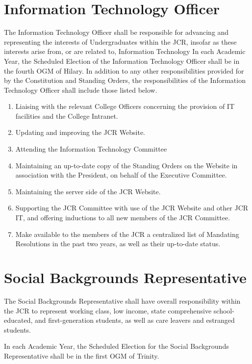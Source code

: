 \section{Information Technology Officer}
\npara The Information Technology Officer shall be responsible for advancing and representing the interests of Undergraduates within the JCR, insofar as these interests arise from, or are related to, Information Technology
\npara In each Academic Year, the Scheduled Election of the Information Technology Officer shall be in the fourth OGM of Hilary.
\npara In addition to any other responsibilities provided for by the Constitution and Standing Orders, the responsibilities of the Information Technology Officer shall include those listed below.
\begin{enumerate}
    \item Liaising with the relevant College Officers concerning the provision of IT facilities and the College Intranet. 
    \item Updating and improving the JCR Website.
    \item Attending the Information Technology Committee 
    \item Maintaining an up-to-date copy of the Standing Orders on the Website in association with the President, on behalf of the Executive Committee. 
    \item Maintaining the server side of the JCR Website. 
    \item Supporting the JCR Committee with use of the JCR Website and other JCR IT, and offering inductions to all new members of the JCR Committee.
    \item Make available to the members of the JCR a centralized list of Mandating Resolutions in the past two years, as well as their up-to-date status.
\end{enumerate}
\section{Social Backgrounds Representative}
\npara	The Social Backgrounds Representative shall have overall responsibility within the JCR to represent working class, low income, state comprehensive school-educated, and first-generation students, as well as care leavers and estranged students.

\npara In each Academic Year, the Scheduled Election for the Social Backgrounds Representative shall be in the first OGM of Trinity.

